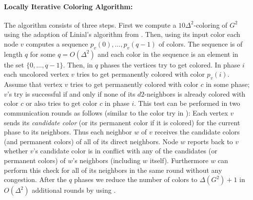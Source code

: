 \paragraph{Locally Iterative Coloring Algorithm:} The algorithm consists of three steps. First we compute a $10\Delta^2$-coloring of $G^2$ using the adaption of Linial's algorithm from . 
Then, using its input color each node $v$ computes a sequence $p_v(0),\ldots, p_v(q-1)$ of colors. The sequence is of length $q$ for some $q=O(\Delta^2)$ and  each color in the sequence is an element in the set $\{0,\ldots,q-1\}$. Then, in $q$ phases the vertices try to get colored. In phase $i$ each uncolored vertex $v$ tries to get permanently colored with color $p_v(i)$. Assume that vertex $v$ tries to get permanently colored with color $c$ in some phase; $v$'s try is successful if and only if none of its $d2$-neighbors is already colored with color $c$ or also tries to get color $c$ in phase $i$. This test can be performed in two communication rounds as follows (similar to the color try in ): Each vertex $v$ sends its \emph{candidate color} (or its permanent color if it is colored) for the current phase to its neighbors. Thus each neighbor $w$ of $v$ receives the candidate colors (and permanent colors) of all of its direct neighbors. Node $w$ reports back to $v$ whether $v$'s candidate color is in conflict with any of the candidates (or permanent colors) of $w$'s neighbors (including $w$ itself). Furthermore $w$ can perform this check for all of its neighbors in the same round without any congestion. After the $q$ phases
we reduce the number of colors to $\Delta(G^2)+1$ in $O(\Delta^2)$ additional rounds by using .


